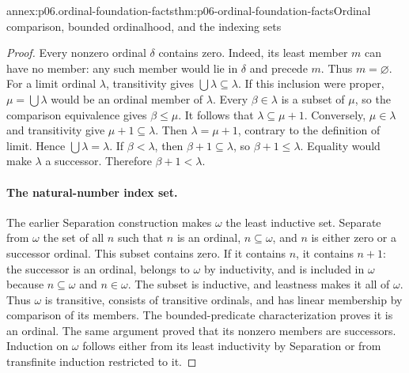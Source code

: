 \begin{annexitem}{annex:p06.ordinal-foundation-facts}{thm:p06-ordinal-foundation-facts}{Ordinal comparison, bounded ordinalhood, and the indexing sets}
\begin{proof}
Every nonzero ordinal \(\delta\) contains zero.  Indeed, its least
member \(m\) can have no member: any such member would lie in
\(\delta\) and precede \(m\).  Thus \(m=\varnothing\).
For a limit ordinal \(\lambda\), transitivity gives
\(\bigcup\lambda\subseteq\lambda\).  If this inclusion were
proper, \(\mu=\bigcup\lambda\) would be an ordinal member of
\(\lambda\).  Every \(\beta\in\lambda\) is a subset of \(\mu\),
so the comparison equivalence gives \(\beta\leq\mu\).  It follows
that \(\lambda\subseteq\mu+1\).  Conversely, \(\mu\in\lambda\)
and transitivity give \(\mu+1\subseteq\lambda\).
Then \(\lambda=\mu+1\), contrary to the definition of limit.
Hence \(\bigcup\lambda=\lambda\).
If \(\beta<\lambda\), then \(\beta+1\subseteq\lambda\), so
\(\beta+1\leq\lambda\).  Equality would make \(\lambda\) a
successor.  Therefore \(\beta+1<\lambda\).

\paragraph{The natural-number index set.}
The earlier Separation construction makes \(\omega\) the least
inductive set.  Separate from \(\omega\) the set of all \(n\)
such that \(n\) is an ordinal, \(n\subseteq\omega\), and \(n\)
is either zero or a successor ordinal.  This subset contains zero.
If it contains \(n\), it contains \(n+1\): the successor is an
ordinal, belongs to \(\omega\) by inductivity, and is included
in \(\omega\) because \(n\subseteq\omega\) and \(n\in\omega\).
The subset is inductive, and leastness makes it all of \(\omega\).
Thus \(\omega\) is transitive, consists of transitive ordinals,
and has linear membership by comparison of its members.
The bounded-predicate characterization proves it is an ordinal.
The same argument proved that its nonzero members are successors.
Induction on \(\omega\) follows either from its least inductivity
by Separation or from transfinite induction restricted to it.
\end{proof}
\end{annexitem}

